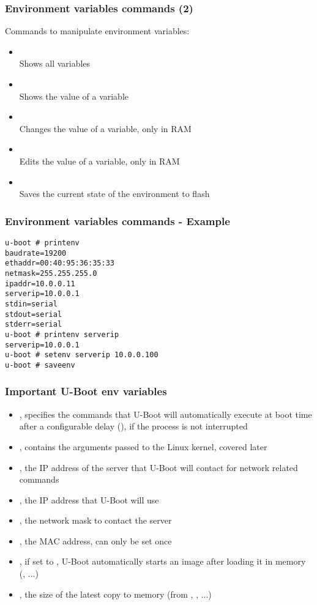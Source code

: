 \begin{frame}
  \frametitle{Environment variables commands (2)}
  Commands to manipulate environment variables:
  \begin{itemize}
    \item {}\\
      Shows all variables
    \item {}\\
      Shows the value of a variable
    \item {}\\
      Changes the value of a variable, only in RAM
    \item {}\\
      Edits the value of a variable, only in RAM
    \item {}\\
      Saves the current state of the environment to flash
  \end{itemize}
\end{frame}

\begin{frame}[fragile]
\frametitle{Environment variables commands - Example}
\begin{verbatim}
u-boot # printenv
baudrate=19200
ethaddr=00:40:95:36:35:33
netmask=255.255.255.0
ipaddr=10.0.0.11
serverip=10.0.0.1
stdin=serial
stdout=serial
stderr=serial
u-boot # printenv serverip
serverip=10.0.0.1
u-boot # setenv serverip 10.0.0.100
u-boot # saveenv
\end{verbatim}
\end{frame}

\begin{frame}
  \frametitle{Important U-Boot env variables}
  \begin{itemize}
  \item {}, specifies the commands that U-Boot will
    automatically execute at boot time after a configurable delay
    (), if the process is not interrupted
  \item {}, contains the arguments passed to the Linux
    kernel, covered later
  \item {}, the IP address of the server that U-Boot will
    contact for network related commands
  \item {}, the IP address that U-Boot will use
  \item {}, the network mask to contact the server
  \item {}, the MAC address, can only be set once
  \item {}, if set to , U-Boot automatically
    starts an image after loading it in memory (,
    ...)
  \item {}, the size of the latest copy to memory
    (from , , ...)
  \end{itemize}
\end{frame}


